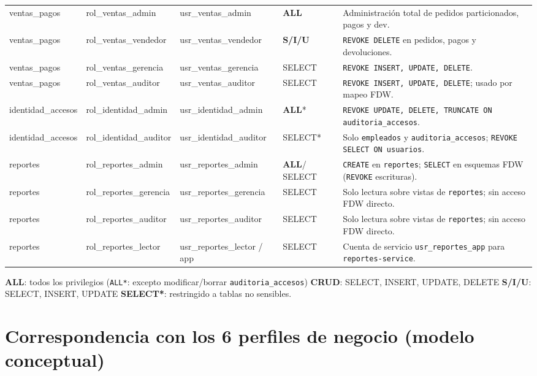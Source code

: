 \documentclass[11pt,oneside]{article}
\newcommand{\pALL}{%
  \textcolor{acento}{\sffamily\bfseries ALL}}
\newcommand{\pSEL}{%
  \textcolor{gris}{\sffamily SELECT}}
\newcommand{\pSIU}{%
  \textcolor{gris}{\sffamily\bfseries S/I/U}}
\begin{document}
\begin{center}
{\begin{tabularx}{\linewidth}{%
    >{\ttfamily\scriptsize}p{3.15cm}
    >{\ttfamily\scriptsize}p{3.05cm}
    >{\ttfamily\scriptsize}p{2.95cm}
    >{\centering\arraybackslash}p{1.25cm}
    >{\small\raggedright\arraybackslash}X}
ventas\_pagos & rol\_ventas\_admin & usr\_ventas\_admin & \pALL &
  Administraci\'on total de pedidos particionados, pagos y dev. \\
ventas\_pagos & rol\_ventas\_vendedor & usr\_ventas\_vendedor & \pSIU &
  \texttt{REVOKE DELETE} en pedidos, pagos y devoluciones. \\
ventas\_pagos & rol\_ventas\_gerencia & usr\_ventas\_gerencia & \pSEL &
  \texttt{REVOKE INSERT, UPDATE, DELETE}. \\
ventas\_pagos & rol\_ventas\_auditor & usr\_ventas\_auditor & \pSEL &
  \texttt{REVOKE INSERT, UPDATE, DELETE}; usado por mapeo FDW. \\
\midrule
identidad\_accesos & rol\_identidad\_admin & usr\_identidad\_admin & \pALL* &
  \texttt{REVOKE UPDATE, DELETE, TRUNCATE ON auditoria\_accesos}. \\
identidad\_accesos & rol\_identidad\_auditor & usr\_identidad\_auditor & \pSEL* &
  Solo \texttt{empleados} y \texttt{auditoria\_accesos}; \texttt{REVOKE SELECT ON usuarios}. \\
\midrule
reportes & rol\_reportes\_admin & usr\_reportes\_admin & \pALL/\pSEL &
  \texttt{CREATE} en \texttt{reportes}; \texttt{SELECT} en esquemas FDW (\texttt{REVOKE} escrituras). \\
reportes & rol\_reportes\_gerencia & usr\_reportes\_gerencia & \pSEL &
  Solo lectura sobre vistas de \texttt{reportes}; sin acceso FDW directo. \\
reportes & rol\_reportes\_auditor & usr\_reportes\_auditor & \pSEL &
  Solo lectura sobre vistas de \texttt{reportes}; sin acceso FDW directo. \\
reportes & rol\_reportes\_lector & usr\_reportes\_lector / app & \pSEL &
  Cuenta de servicio \texttt{usr\_reportes\_app} para \texttt{reportes-service}. \\
\bottomrule
\end{tabularx}}
\end{center}

\vspace{0.25em}
{\footnotesize\sffamily\color{gris}
  \textbf{ALL}: todos los privilegios (\texttt{ALL*}: excepto modificar/borrar \texttt{auditoria\_accesos}) \textperiodcentered{}
  \textbf{CRUD}: SELECT, INSERT, UPDATE, DELETE \textperiodcentered{}
  \textbf{S/I/U}: SELECT, INSERT, UPDATE \textperiodcentered{}
  \textbf{SELECT*}: restringido a tablas no sensibles.}

\newpage
\section{Correspondencia con los 6 perfiles de negocio (modelo conceptual)}
\end{document}
